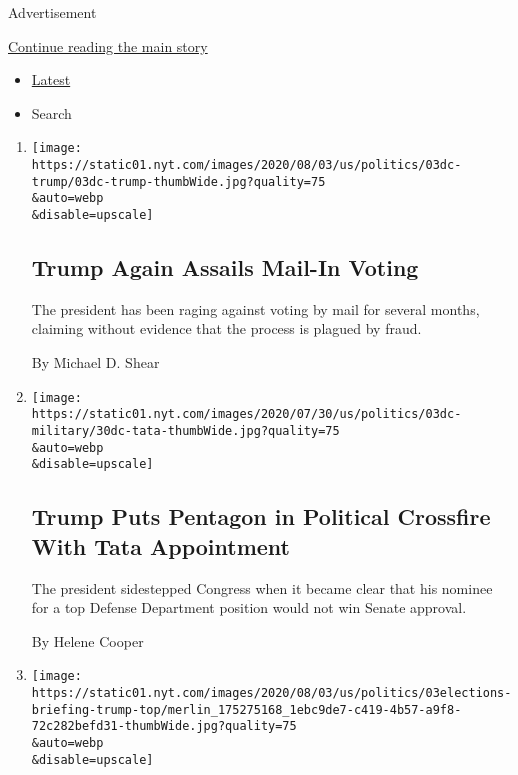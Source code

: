 Advertisement

\protect\hyperlink{after-mid1}{Continue reading the main story}

\begin{itemize}
\tightlist
\item
  \protect\hyperlink{stream-panel}{Latest}
\item
  Search
\end{itemize}

\begin{enumerate}
\def\labelenumi{\arabic{enumi}.}
\item
  \href{/2020/08/03/us/politics/trump-mail-in-voting.html}{}

  \texttt{[image: https://static01.nyt.com/images/2020/08/03/us/politics/03dc-trump/03dc-trump-thumbWide.jpg?quality=75\\\&auto=webp\\\&disable=upscale]}

  \hypertarget{trump-again-assails-mail-in-voting}{%
  \subsection{Trump Again Assails Mail-In
  Voting}\label{trump-again-assails-mail-in-voting}}

  The president has been raging against voting by mail for several
  months, claiming without evidence that the process is plagued by
  fraud.

  By Michael D. Shear
\item
  \href{/2020/08/03/us/politics/tata-pentagon.html}{}

  \texttt{[image: https://static01.nyt.com/images/2020/07/30/us/politics/03dc-military/30dc-tata-thumbWide.jpg?quality=75\\\&auto=webp\\\&disable=upscale]}

  \hypertarget{trump-puts-pentagon-in-political-crossfire-with-tata-appointment}{%
  \subsection{Trump Puts Pentagon in Political Crossfire With Tata
  Appointment}\label{trump-puts-pentagon-in-political-crossfire-with-tata-appointment}}

  The president sidestepped Congress when it became clear that his
  nominee for a top Defense Department position would not win Senate
  approval.

  By Helene Cooper
\item
  \href{/2020/08/03/us/elections/biden-vs-trump.html}{}

  \texttt{[image: https://static01.nyt.com/images/2020/08/03/us/politics/03elections-briefing-trump-top/merlin\_175275168\_1ebc9de7-c419-4b57-a9f8-72c282befd31-thumbWide.jpg?quality=75\\\&auto=webp\\\&disable=upscale]}


\end{enumerate}
